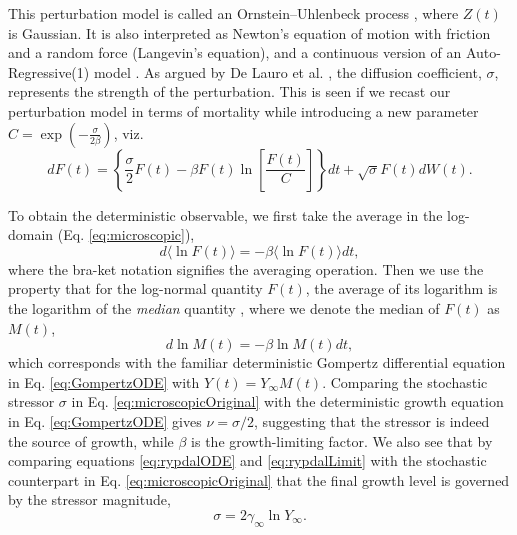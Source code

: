 \documentclass[review]{elsarticle}
\begin{document}
This perturbation model is called an Ornstein–Uhlenbeck process \citep{risken1996fokker}, where $Z(t)$ is Gaussian. It is also interpreted as Newton's equation of motion with friction and a random force (Langevin's equation), and a continuous version of an Auto-Regressive(1) model \citep{akaike1970statistical}. As argued by De Lauro et al. \cite{de2014stochastic}, the diffusion coefficient, $\sigma$, represents the strength of the perturbation. This is seen if we recast our perturbation model in terms of mortality while introducing a new parameter $C=\exp{(-\frac{\sigma}{2\beta})}$, viz. 
\begin{equation}
\label{eq:microscopicOriginal}
dF(t) = \left\{\frac{\sigma}{2}F(t) - \beta F(t)\ln\left[\frac{F(t)}{C}\right]\right\}dt + \sqrt{\sigma}F(t)dW(t).
\end{equation}

To obtain the deterministic observable, we first take the average in the log-domain (Eq. \ref{eq:microscopic}), 
\begin{equation}
d\langle\ln{F(t)}\rangle = -\beta \langle\ln{F(t)}\rangle dt,
\end{equation}
where the bra-ket notation signifies the averaging operation.
Then we use the property that for the log-normal quantity $F(t)$, the average of its logarithm is the logarithm of the \emph{median} quantity \cite{petroni2020gompertz}, where we denote the median of $F(t)$ as $M(t)$, 
\begin{equation}
\label{eq:medianGomp}
d\ln{M(t)} = -\beta \ln{M(t)} dt,
\end{equation}
which corresponds with the familiar deterministic Gompertz differential equation in Eq. \ref{eq:GompertzODE} with $Y(t) = Y_\infty M(t)$. 
Comparing the stochastic stressor $\sigma$ in Eq. \ref{eq:microscopicOriginal} with the deterministic growth equation in Eq. \ref{eq:GompertzODE} gives $\nu=\sigma/2$, suggesting that the stressor is indeed the source of growth, while $\beta$ is the growth-limiting factor. 
We also see that by comparing equations \ref{eq:rypdalODE} and \ref{eq:rypdalLimit} with the stochastic counterpart in Eq. \ref{eq:microscopicOriginal} that the final growth level is governed by the stressor magnitude,
\begin{equation}
\sigma = 2\gamma_{\infty}\ln{Y_{\infty}}.
\end{equation}
\end{document}
